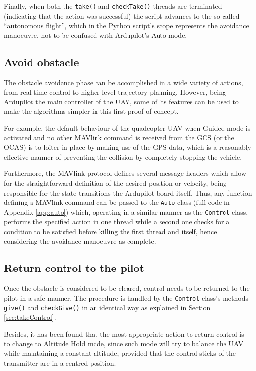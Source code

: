 Finally, when both the \texttt{take()} and \texttt{checkTake()} threads are terminated (indicating that the action was successful) the script advances to the so called ``autonomous flight'', which in the Python script's scope represents the avoidance manoeuvre, not to be confused with Ardupilot's Auto mode.

\subsection{Avoid obstacle} \label{sec:avoid}

The obstacle avoidance phase can be accomplished in a wide variety of actions, from real-time control to higher-level trajectory planning.
However, being Ardupilot the main controller of the UAV, some of its features can be used to make the algorithms simpler in this first proof of concept.

For example, the default behaviour of the quadcopter UAV when Guided mode is activated and no other MAVlink command is received from the GCS (or the OCAS) is to loiter in place by making use of the GPS data, which is a reasonably effective manner of preventing the collision by completely stopping the vehicle.

Furthermore, the MAVlink protocol defines several message headers which allow for the straightforward definition of the desired position or velocity, being responsible for the state transitions the Ardupilot board itself.
Thus, any function defining a MAVlink command can be passed to the \texttt{Auto} class (full code in Appendix \ref{app:auto}) which, operating in a similar manner as the \texttt{Control} class, performs the specified action in one thread while a second one checks for a condition to be satisfied before killing the first thread and itself, hence considering the avoidance manoeuvre as complete. 

\subsection{Return control to the pilot} \label{sec:returnControl}

Once the obstacle is considered to be cleared, control needs to be returned to the pilot in a safe manner.
The procedure is handled by the \texttt{Control} class's methods \texttt{give()} and \texttt{checkGive()} in an identical way as explained in Section \ref{sec:takeControl}.

Besides, it has been found that the most appropriate action to return control is to change to Altitude Hold mode, since such mode will try to balance the UAV while maintaining a constant altitude, provided that the control sticks of the transmitter are in a centred position.

